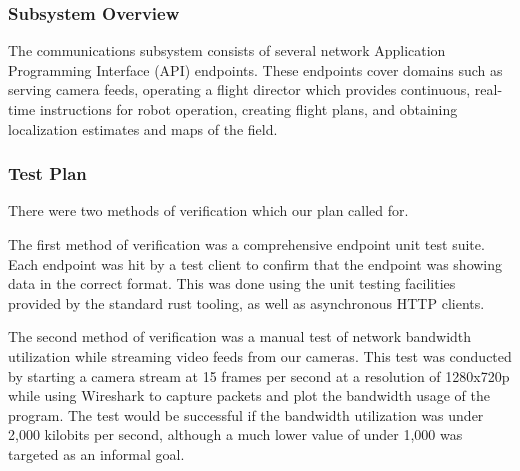 \subsubsection{Subsystem Overview}
The communications subsystem consists of several network Application Programming Interface (API)
endpoints.
These endpoints cover domains such as serving camera feeds, operating a flight director which
provides continuous, real-time instructions for robot operation, creating flight plans,
and obtaining localization estimates and maps of the field.

\subsubsection{Test Plan}
There were two methods of verification which our plan called for.

The first method of verification was a comprehensive endpoint unit test suite.
Each endpoint was hit by a test client to confirm that the endpoint was showing data in the correct
format.
This was done using the unit testing facilities provided by the standard rust tooling, as well as
asynchronous HTTP clients.

The second method of verification was a manual test of network bandwidth utilization while
streaming video feeds from our cameras.
This test was conducted by starting a camera stream at 15 frames per second at a resolution of
1280x720p while using Wireshark\cite{wireshark} to capture packets and plot the bandwidth usage of
the program.
The test would be successful if the bandwidth utilization was under 2,000 kilobits per second,
although a much lower value of under 1,000 was targeted as an informal goal.